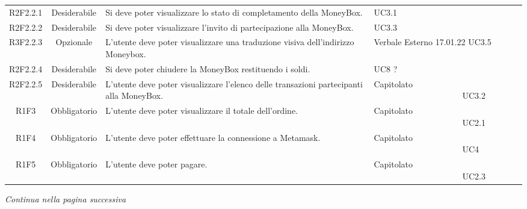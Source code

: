 \begin{table}[H]
\begin{tabular}{c | c | p{6cm} | p{4.1cm}}
        R2F2.2.1                                                          & Desiderabile & Si deve poter visualizzare lo stato di completamento della MoneyBox\glo{}.            & UC3.1                            \\
        R2F2.2.2                                                          & Desiderabile & Si deve poter visualizzare l'invito di partecipazione alla MoneyBox\glo{}.            & UC3.3                            \\
        R3F2.2.3                                                          & Opzionale    & L'utente deve poter visualizzare una traduzione visiva dell'indirizzo Moneybox\glo{}. & Verbale Esterno 17.01.22 UC3.5   \\
        R2F2.2.4                                                          & Desiderabile & Si deve poter chiudere la MoneyBox\glo{} restituendo i soldi.                         & UC8 ?                            \\
        R2F2.2.5                                                          & Desiderabile & L'utente deve poter visualizzare l'elenco delle transazioni partecipanti alla MoneyBox\glo{}.    & Capitolato \ \ \ \ \ \ \ \ \ \ \ \ \ \ \ \ \ \ \ \ \ UC3.2      \\
        R1F3                                                              & Obbligatorio & L'utente deve poter visualizzare il totale dell'ordine.                               & Capitolato \ \ \ \ \ \ \ \ \ \ \ \ \ \ \ \ \ \ \ \ \ UC2.1                 \\
        R1F4                                                              & Obbligatorio & L'utente deve poter effettuare la connessione a Metamask\glo{}.                       & Capitolato \ \ \ \ \ \ \ \ \ \ \ \ \ \ \ \ \ \ \ \ \ UC4                   \\
        R1F5                                                              & Obbligatorio & L'utente deve poter pagare.                                                           & Capitolato \ \ \ \ \ \ \ \ \ \ \ \ \ \ \ \ \ \ \ \ \ UC2.3                 \\
    \end{tabular}
\end{table}
\begin{center}
    \textit{\small Continua nella pagina successiva}
\end{center}
